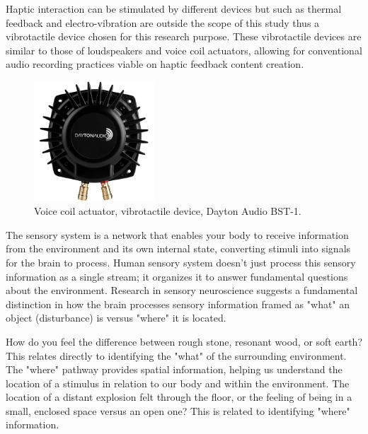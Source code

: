            Haptic interaction can be stimulated by different devices but such as thermal feedback and electro-vibration are outside the scope of this study thus a vibrotactile device chosen for this research purpose. These vibrotactile devices are similar to those of loudspeakers and voice coil actuators\cite{Blank}, allowing for conventional audio recording practices viable on haptic feedback content creation.\par

            \begin{figure}[H]
                \centering
                \includegraphics[width=0.4\textwidth]{images/vibrotactile_bass-shaker.jpg}
                \caption{Voice coil actuator, vibrotactile device, Dayton Audio BST-1.}
                \label{fig:VCA}
            \end{figure}

            The sensory system is a network that enables your body to receive information from the environment and its own internal state, converting stimuli into signals for the brain to process. Human sensory system doesn't just process this sensory information as a single stream; it organizes it to answer fundamental questions about the environment\cite{Blank}. Research in sensory neuroscience suggests a fundamental distinction in how the brain processes sensory information framed as "what" an object (disturbance) is versus "where" it is located.\par

            How do you feel the difference between rough stone, resonant wood, or soft earth? This relates directly to identifying the "what" of the surrounding environment. The "where" pathway provides spatial information, helping us understand the location of a stimulus in relation to our body and within the environment. The location of a distant explosion felt through the floor, or the feeling of being in a small, enclosed space versus an open one? This is related to identifying "where" information.\par

